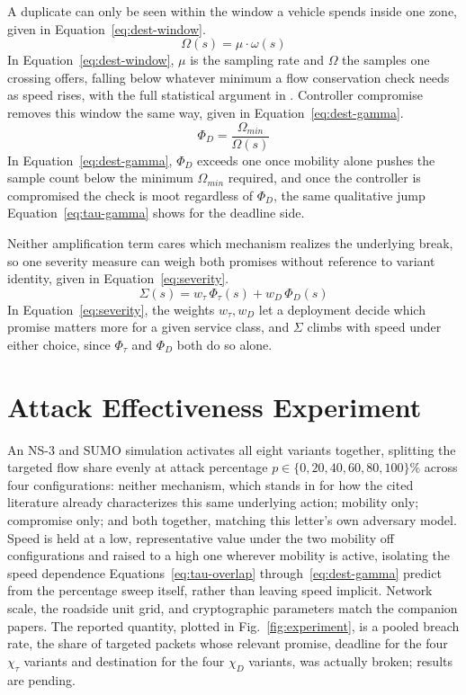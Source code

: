 \documentclass[lettersize,journal]{IEEEtran}
\begin{document}
A duplicate can only be seen within the window a vehicle spends inside one zone, given in Equation~\eqref{eq:dest-window}.
\begin{equation}
\Omega(s) = \mu \cdot \omega(s)
\label{eq:dest-window}
\end{equation}
In Equation~\eqref{eq:dest-window}, $\mu$ is the sampling rate and $\Omega$ the samples one crossing offers, falling below whatever minimum a flow conservation check needs as speed rises, with the full statistical argument in \cite{vanguardhf2026}. Controller compromise removes this window the same way, given in Equation~\eqref{eq:dest-gamma}.
\begin{equation}
\Phi_D = \frac{\Omega_{min}}{\Omega(s)}
\label{eq:dest-gamma}
\end{equation}
In Equation~\eqref{eq:dest-gamma}, $\Phi_D$ exceeds one once mobility alone pushes the sample count below the minimum $\Omega_{min}$ required, and once the controller is compromised the check is moot regardless of $\Phi_D$, the same qualitative jump Equation~\eqref{eq:tau-gamma} shows for the deadline side.

Neither amplification term cares which mechanism realizes the underlying break, so one severity measure can weigh both promises without reference to variant identity, given in Equation~\eqref{eq:severity}.
\begin{equation}
\Sigma(s) = w_\tau\, \Phi_\tau(s) + w_D\, \Phi_D(s)
\label{eq:severity}
\end{equation}
In Equation~\eqref{eq:severity}, the weights $w_\tau,w_D$ let a deployment decide which promise matters more for a given service class, and $\Sigma$ climbs with speed under either choice, since $\Phi_\tau$ and $\Phi_D$ both do so alone.

\section{Attack Effectiveness Experiment}
\label{sec:experiment}
An NS-3 and SUMO simulation activates all eight variants together, splitting the targeted flow share evenly at attack percentage $p\in\{0,20,40,60,80,100\}\%$ across four configurations: neither mechanism, which stands in for how the cited literature already characterizes this same underlying action; mobility only; compromise only; and both together, matching this letter's own adversary model. Speed is held at a low, representative value under the two mobility off configurations and raised to a high one wherever mobility is active, isolating the speed dependence Equations~\eqref{eq:tau-overlap} through~\eqref{eq:dest-gamma} predict from the percentage sweep itself, rather than leaving speed implicit. Network scale, the roadside unit grid, and cryptographic parameters match the companion papers. The reported quantity, plotted in Fig.~\ref{fig:experiment}, is a pooled breach rate, the share of targeted packets whose relevant promise, deadline for the four $\chi_\tau$ variants and destination for the four $\chi_D$ variants, was actually broken; results are pending.
\end{document}
